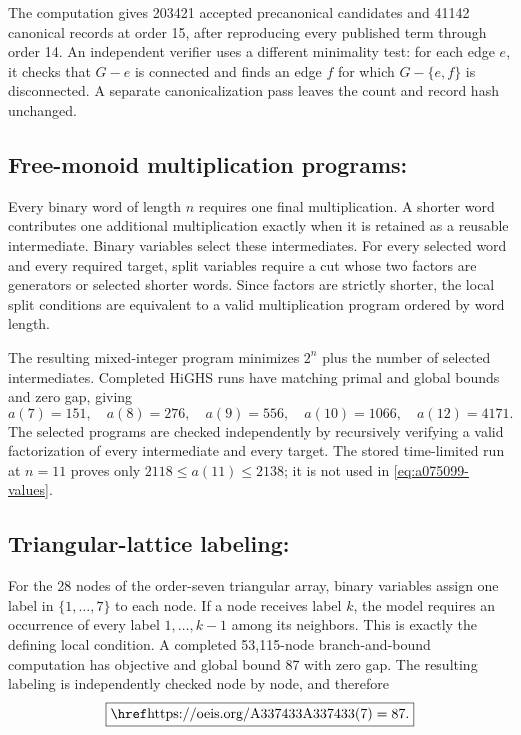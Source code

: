 The computation gives 203421 accepted precanonical candidates and 41142
canonical records at order 15, after reproducing every published term through
order 14.  An independent verifier uses a different minimality test: for each
edge \(e\), it checks that \(G-e\) is connected and finds an edge \(f\) for
which \(G-\{e,f\}\) is disconnected.  A separate canonicalization pass leaves
the count and record hash unchanged.

\subsection{Free-monoid multiplication programs: \texorpdfstring{}{A075099}}

Every binary word of length \(n\) requires one final multiplication.  A
shorter word contributes one additional multiplication exactly when it is
retained as a reusable intermediate.  Binary variables select these
intermediates.  For every selected word and every required target, split
variables require a cut whose two factors are generators or selected shorter
words.  Since factors are strictly shorter, the local split conditions are
equivalent to a valid multiplication program ordered by word length.

The resulting mixed-integer program minimizes \(2^n\) plus the number of
selected intermediates.  Completed HiGHS runs have matching primal and global
bounds and zero gap, giving
\begin{equation}
 \boxed{a(7)=151,\quad a(8)=276,\quad a(9)=556,\quad
        a(10)=1066,\quad a(12)=4171.}
 \label{eq:a075099-values}
\end{equation}
The selected programs are checked independently by recursively verifying a
valid factorization of every intermediate and every target.  The stored
time-limited run at \(n=11\) proves only
\(2118\le a(11)\le2138\); it is not used in
\cref{eq:a075099-values}.

\subsection{Triangular-lattice labeling: \texorpdfstring{}{A337433}}

For the 28 nodes of the order-seven triangular array, binary variables assign
one label in \(\{1,\ldots,7\}\) to each node.  If a node receives label \(k\),
the model requires an occurrence of every label \(1,\ldots,k-1\) among its
neighbors.  This is exactly the defining local condition.  A completed
53,115-node branch-and-bound computation has objective and global bound 87
with zero gap.  The resulting labeling is independently checked node by node,
and therefore
\begin{equation}
 \boxed{\seq{A337433}(7)=87.}
 \label{eq:a337433-value}
\end{equation}

